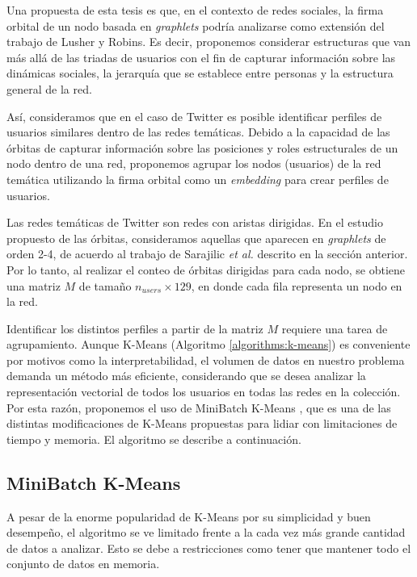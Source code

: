 Una propuesta de esta tesis es que, en el contexto de redes sociales, la firma orbital de un nodo basada en \textit{graphlets} podría analizarse como extensión del trabajo de Lusher y Robins. Es decir, proponemos considerar estructuras que van más allá de las triadas de usuarios con el fin de capturar información sobre las dinámicas sociales, la jerarquía que se establece entre personas y la estructura general de la red. 

Así, consideramos que en el caso de Twitter es posible identificar perfiles de usuarios similares dentro de las redes temáticas. Debido a la capacidad de las órbitas de capturar información sobre las posiciones y roles estructurales de un nodo dentro de una red, proponemos agrupar los nodos (usuarios) de la red temática utilizando la firma orbital como un \textit{embedding} para crear perfiles de usuarios.

Las redes temáticas de Twitter son redes con aristas dirigidas. En el estudio propuesto de las órbitas, consideramos aquellas que aparecen en \textit{graphlets} de orden 2-4, de acuerdo al trabajo de Sarajilic \textit{et al.} descrito en la sección anterior.  Por lo tanto, al realizar el conteo de órbitas dirigidas para cada nodo, se obtiene una matriz $M$ de tamaño $n_{users}\times 129$, en donde cada fila representa un nodo en la red. 


Identificar los distintos perfiles a partir de la matriz $M$ requiere una tarea de agrupamiento. 
Aunque K-Means (Algoritmo \ref{algorithms:k-means}) es conveniente por motivos como la interpretabilidad, el volumen de datos en nuestro problema demanda un método más eficiente, considerando que se desea analizar la representación vectorial de todos los usuarios en todas las redes en la colección. Por esta razón, proponemos el uso de MiniBatch K-Means \cite{sculley_web-scale_2010}, que es una de las distintas modificaciones de K-Means propuestas para lidiar con limitaciones de tiempo y memoria. El algoritmo se describe a continuación. 

\subsection{MiniBatch K-Means}
A pesar de la enorme popularidad de K-Means por su simplicidad y buen desempeño, el algoritmo se ve limitado frente a la cada vez más grande cantidad de datos a analizar. Esto se debe a restricciones como tener que mantener todo el conjunto de datos en memoria. 


